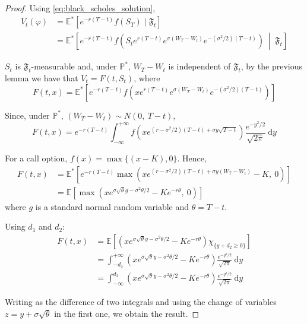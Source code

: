 \begin{proof}
    Using \eqref{eq:black_scholes_solution}, 
    \begin{equation*}
        \begin{aligned}
            V_t(\varphi) &= \mathbb{E}^\ast [e^{-r(T-t)} f(S_T) \mid \mathfrak{F}_t] \\
            &= \mathbb{E}^\ast \left[ e^{-r(T-t)} f \left( S_t e^{r(T-t)} e^{\sigma (W_T - W_t)} e^{- (\sigma^2/2)(T-t)} \right) ~ \middle| ~ \mathfrak{F}_t \right]
        \end{aligned}
    \end{equation*}

    $S_t$ is $\mathfrak{F}_t$-measurable and, under $\mathbb{P}^\ast$, $W_T - W_t$ is independent of $\mathfrak{F}_t$, by the previous lemma we have that $V_t = F(t, S_t)$, where 
    \[
        F(t, x) = \mathbb{E}^\ast \left[ e^{-r(T-t)} f \left( x e^{r(T-t)} e^{\sigma (W_T - W_t)} e^{- (\sigma^2/2)(T-t)} \right) \right]
    \]

    Since, under $\mathbb{P}^\ast$, $(W_T - W_t) \sim N(0, ~T-t)$, 
    \[
        F(t, x) = e^{-r(T-t)} \int_{-\infty}^{+\infty} f \left( x e^{(r-\sigma^2/2)(T-t) + \sigma y \sqrt{T-t}} \right) \frac{e^{-y^2/2}}{\sqrt{2\pi}} ~\mathrm{d}y
    \]

    For a call option, $f(x) = \max \{(x-K), 0\}$. Hence,
    \begin{equation*}
        \begin{aligned}
            F(t, x) &= \mathbb{E}^\ast \left[ e^{-r(T-t)} \max \left( x e^{(r-\sigma^2/2)(T-t) + \sigma y (W_T - W_t)} - K, ~0 \right) \right] \\
            &= \mathbb{E} \left[ \max \left( x e^{\sigma \sqrt{\theta} g -\sigma^2 \theta/2} - Ke^{-r\theta}, ~0 \right) \right]
        \end{aligned}
    \end{equation*}
    where $g$ is a standard normal random variable and $\theta = T - t$.

    Using $d_1$ and $d_2$:
    \begin{equation*}
        \begin{aligned}
            F(t, x) &= \mathbb{E} \left[ \left( x e^{\sigma \sqrt{\theta} g -\sigma^2 \theta/2} - Ke^{-r\theta} \right) \chi_{\{ g + d_2 \ge 0 \}} \right] \\
            &= \int_{- d_2}^{+\infty} \left( x e^{\sigma \sqrt{\theta} y -\sigma^2 \theta/2} - Ke^{-r\theta} \right) \frac{e^{-y^2/2}}{\sqrt{2\pi}} ~\mathrm{d}y \\
            &= \int_{- \infty}^{d_2} \left( x e^{\sigma \sqrt{\theta} y -\sigma^2 \theta/2} - Ke^{-r\theta} \right) \frac{e^{-y^2/2}}{\sqrt{2\pi}} ~\mathrm{d}y
        \end{aligned}
    \end{equation*}

    Writing as the difference of two integrals and using the change of variables $z = y + \sigma \sqrt{\theta}$ in the first one, we obtain the result.
\end{proof}

